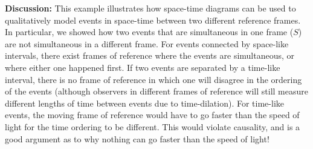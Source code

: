 \begin{framed}
\begin{framed}
\textbf{Discussion:} This example illustrates how space-time diagrams can be used to qualitatively model events in space-time between two different reference frames. In particular, we showed how two events that are simultaneous in one frame ($S$) are not simultaneous in a different frame. For events connected by space-like intervals, there exist frames of reference where the events are simultaneous, or where either one happened first. If two events are separated by a time-like interval, there is no frame of reference in which one will disagree in the ordering of the events (although observers in different frames of reference will still measure different lengths of time between events due to time-dilation). For time-like events, the moving frame of reference would have to go faster than the speed of light for the time ordering to be different. This would violate causality, and is a good argument as to why nothing can go faster than the speed of light!
\end{framed}
\end{framed}

